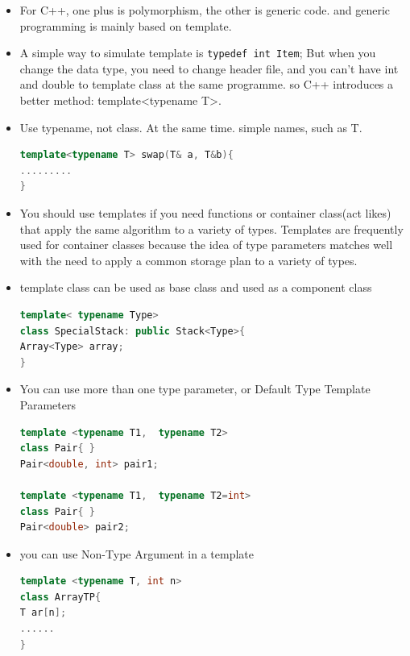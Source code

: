 \documentclass[a4paper,12pt,twoside]{book}
\begin{document}
\begin{itemize}

\item For C++, one plus is polymorphism, the other is generic code. and generic programming is mainly based on template. 

\item A simple way to simulate template is \verb=typedef int Item=; But when you change the data type, you need to change header file, and you can't have int and double to template class at the same programme. so C++ introduces a better method: template<typename T>.

\item Use typename, not class. At the same time. simple names, such as T.
\begin{lstlisting}[frame=single, language=c++]
template<typename T> swap(T& a, T&b){
.........
}
\end{lstlisting}

\item You should use templates if you need functions or container class(act likes) that apply the same algorithm to a variety of types. Templates are frequently used for container classes because the idea of type parameters matches well with the need to apply a common storage plan to a variety of types.

\item template class can be used as base class and used as a component class
\begin{lstlisting}[frame=single, language=c++]
template< typename Type>
class SpecialStack: public Stack<Type>{
Array<Type> array;
}
\end{lstlisting}


\item You can use more than one type parameter, or Default Type Template Parameters
\begin{lstlisting}[frame=single, language=c++]
template <typename T1,  typename T2>
class Pair{ }
Pair<double, int> pair1;

template <typename T1,  typename T2=int>
class Pair{ }
Pair<double> pair2;
\end{lstlisting}

\item you can use Non-Type Argument in a template
\begin{lstlisting}[frame=single, language=c++]
template <typename T, int n>
class ArrayTP{
T ar[n];
......
}
\end{lstlisting}


\end{itemize}
\end{document}
